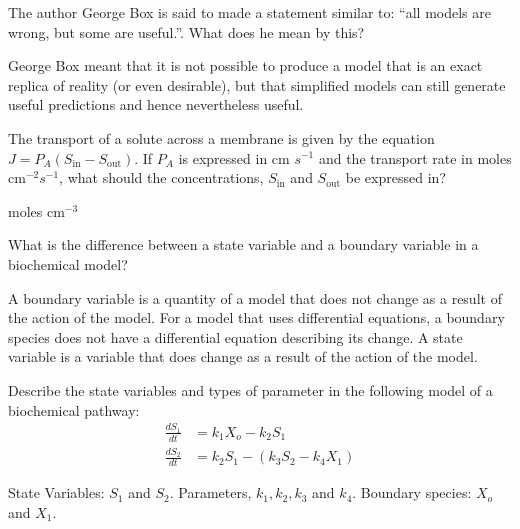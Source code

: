 \documentclass[12pt]{article}
\begin{document}
\begin{question}
The author George Box is said to made a statement similar to: ``all models are wrong, but some are useful.''. What does he mean by this?
\end{question}
\begin{solution}
George Box meant that it is not possible to produce a model that is an exact replica of reality (or even desirable), but that simplified models can still generate useful predictions and hence nevertheless useful.
\end{solution}



\begin{question}
The transport of a solute across a membrane is given by the equation $J = P_A (S_{\text{in}} - S_{\text{out}})$. If $P_A$ is expressed in cm $s^{-1}$ and the transport rate in moles cm$^{-2} s^{-1}$, what should the concentrations, $S_{\text{in}}$ and $S_{\text{out}}$ be expressed in?
\end{question}
\begin{solution}
moles cm$^{-3}$
\end{solution}



\begin{question}
What is the difference between a state variable and a boundary variable in a biochemical model?
\end{question}
\begin{solution}
A boundary variable is a quantity of a model that does not change as a result of the action of the model. For a model that uses differential equations, a boundary species does not have a differential equation describing its change. A state variable is a variable that does change as a result of the action of the model.
\end{solution}


\begin{question}
Describe the state variables and types of parameter in the following model of a biochemical pathway:
%
\begin{align*}
\frac{dS_1}{dt} &= k_1 X_o - k_2 S_1 \\[8pt]
\frac{dS_2}{dt} &= k_2 S_1 - (k_3 S_2 - k_4 X_1)
\end{align*}
\end{question}
\begin{solution}
State Variables: $S_1$ and $S_2$. Parameters, $k_1, k_2, k_3$ and $k_4$. Boundary species: $X_o$ and $X_1$.
\end{solution}
\end{document}
